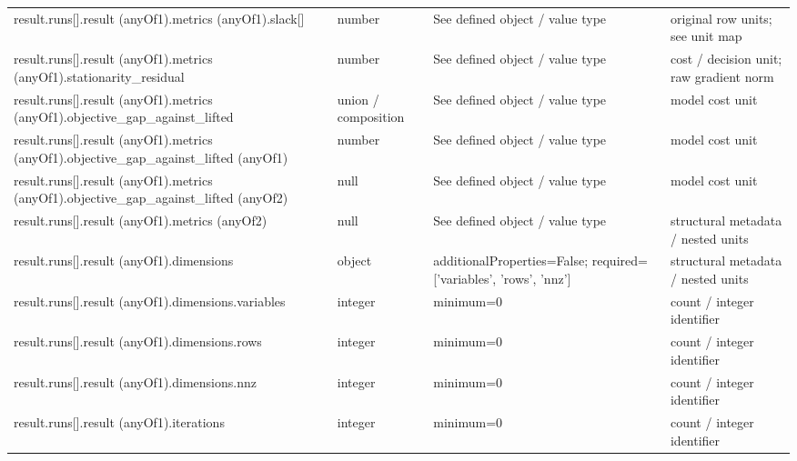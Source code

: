 \begin{longtable}{@{}>{\raggedright\arraybackslash}p{}>{\raggedright\arraybackslash}p{}>{\raggedright\arraybackslash}p{}>{\raggedright\arraybackslash}p{}@{}}
result.\allowbreak{}runs[].\allowbreak{}result (anyOf1).\allowbreak{}metrics (anyOf1).\allowbreak{}slack[] & number & See defined object /\allowbreak{} value type & original row units; see unit map\\
result.\allowbreak{}runs[].\allowbreak{}result (anyOf1).\allowbreak{}metrics (anyOf1).\allowbreak{}stationarity\_\allowbreak{}residual & number & See defined object /\allowbreak{} value type & cost /\allowbreak{} decision unit; raw gradient norm\\
result.\allowbreak{}runs[].\allowbreak{}result (anyOf1).\allowbreak{}metrics (anyOf1).\allowbreak{}objective\_\allowbreak{}gap\_\allowbreak{}against\_\allowbreak{}lifted & union /\allowbreak{} composition & See defined object /\allowbreak{} value type & model cost unit\\
result.\allowbreak{}runs[].\allowbreak{}result (anyOf1).\allowbreak{}metrics (anyOf1).\allowbreak{}objective\_\allowbreak{}gap\_\allowbreak{}against\_\allowbreak{}lifted (anyOf1) & number & See defined object /\allowbreak{} value type & model cost unit\\
result.\allowbreak{}runs[].\allowbreak{}result (anyOf1).\allowbreak{}metrics (anyOf1).\allowbreak{}objective\_\allowbreak{}gap\_\allowbreak{}against\_\allowbreak{}lifted (anyOf2) & null & See defined object /\allowbreak{} value type & model cost unit\\
result.\allowbreak{}runs[].\allowbreak{}result (anyOf1).\allowbreak{}metrics (anyOf2) & null & See defined object /\allowbreak{} value type & structural metadata /\allowbreak{} nested units\\
result.\allowbreak{}runs[].\allowbreak{}result (anyOf1).\allowbreak{}dimensions & object & additionalProperties=\allowbreak{}False; required=\allowbreak{}['variables', 'rows', 'nnz'] & structural metadata /\allowbreak{} nested units\\
result.\allowbreak{}runs[].\allowbreak{}result (anyOf1).\allowbreak{}dimensions.\allowbreak{}variables & integer & minimum=\allowbreak{}0 & count /\allowbreak{} integer identifier\\
result.\allowbreak{}runs[].\allowbreak{}result (anyOf1).\allowbreak{}dimensions.\allowbreak{}rows & integer & minimum=\allowbreak{}0 & count /\allowbreak{} integer identifier\\
result.\allowbreak{}runs[].\allowbreak{}result (anyOf1).\allowbreak{}dimensions.\allowbreak{}nnz & integer & minimum=\allowbreak{}0 & count /\allowbreak{} integer identifier\\
result.\allowbreak{}runs[].\allowbreak{}result (anyOf1).\allowbreak{}iterations & integer & minimum=\allowbreak{}0 & count /\allowbreak{} integer identifier\\

\end{longtable}
